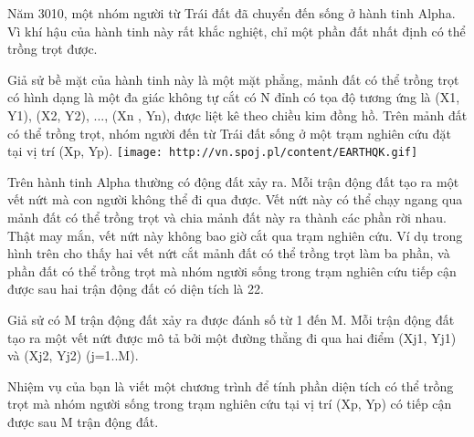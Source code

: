 Năm 3010, một nhóm người từ Trái đất đã chuyển đến sống ở hành tinh Alpha. Vì khí hậu của hành tinh này rất khắc nghiệt, chỉ một phần đất nhất định có thể trồng trọt được.  

   Giả sử bề mặt của hành tinh này là một mặt phẳng, mảnh đất có thể trồng trọt có hình dạng là một đa giác không tự cắt có N đỉnh có tọa độ tương ứng là (X1, Y1), (X2, Y2), ..., (Xn , Yn), được liệt kê theo chiều kim đồng hồ. Trên mảnh đất có thể trồng trọt, nhóm người đến từ Trái đất sống ở một trạm nghiên cứu đặt tại vị trí (Xp, Yp).  
\texttt{[image: http://vn.spoj.pl/content/EARTHQK.gif]}

   Trên hành tinh Alpha thường có động đất xảy ra. Mỗi trận động đất tạo ra một vết nứt mà con người không thể đi qua được. Vết nứt này có thể chạy ngang qua mảnh đất có thể trồng trọt và chia mảnh đất này ra thành các phần rời nhau. Thật may mắn, vết nứt này không bao giờ cắt qua trạm nghiên cứu. Ví dụ trong hình trên cho thấy hai vết nứt cắt mảnh đất có thể trồng trọt làm ba phần, và phần đất có thể trồng trọt mà nhóm người sống trong trạm nghiên cứu tiếp cận được sau hai trận động đất có diện tích là 22.  

   Giả sử có M trận động đất xảy ra được đánh số từ 1 đến M. Mỗi trận động đất tạo ra một vết nứt được mô tả bởi một đường thẳng đi qua hai điểm (Xj1, Yj1) và (Xj2, Yj2) (j=1..M).  

   Nhiệm vụ của bạn là viết một chương trình để tính phần diện tích có thể trồng trọt mà nhóm người sống trong trạm nghiên cứu tại vị trí (Xp, Yp) có tiếp cận được sau M trận động đất.  

\